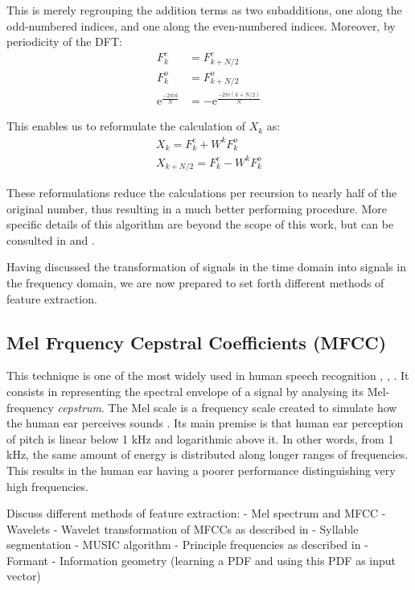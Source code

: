 \documentclass[../main.tex]{subfiles}
\begin{document}
\par This is merely regrouping the addition terms as two subadditions, one along the odd-numbered indices, and one along the even-numbered indices. Moreover, by periodicity of the DFT:
\begin{align*}
F^e_k &= F^e_{k+N/2}\\
F^o_k &= F^o_{k+N/2}\\
\mathrm{e}^ {\frac{-2\pi ik}{N} } &= -\mathrm{e}^ {\frac{-2\pi i(k+N/2)}{N} }
\end{align*}
\par This enables us to reformulate the calculation of $X_k$ as:
\begin{align*}
X_k = F^e_k + W^kF^o_k\\
X_{k+N/2} = F^e_k - W^kF^o_k
\end{align*}
\par These reformulations reduce the calculations per recursion to nearly half of the original number, thus resulting in a much better performing procedure. More specific details of this algorithm are beyond the scope of this work, but can be consulted in \cite{Smith2011} and \cite{Cooley1965}.
\par Having discussed the transformation of signals in the time domain into signals in the frequency domain, we are now prepared to set forth different methods of feature extraction.

\subsection{Mel Frquency Cepstral Coefficients (MFCC)}
\par This technique is one of the most widely used in human speech recognition \cite{Jurafsky2009}, \cite{Chou2008a}, \cite{Stowell2014}. It consists in representing the spectral envelope of a signal by analysing its Mel-frequency \emph{cepstrum}. The Mel scale is a frequency scale created to simulate how the human ear perceives sounds \cite{Sludge2000}. Its main premise is that human ear perception of pitch is linear below 1 kHz and logarithmic above it. In other words, from 1 kHz, the same amount of energy is distributed along longer ranges of frequencies. This results in the human ear having a poorer performance distinguishing very high frequencies.
\par 
Discuss different methods of feature extraction:
- Mel spectrum and MFCC
- Wavelets
- Wavelet transformation of MFCCs as described in \cite{Chou2009}
- Syllable segmentation
- MUSIC algorithm
- Principle frequencies as described in \cite{Chou2008}
- Formant
- Information geometry (learning a PDF and using this PDF as input vector)
\end{document}
